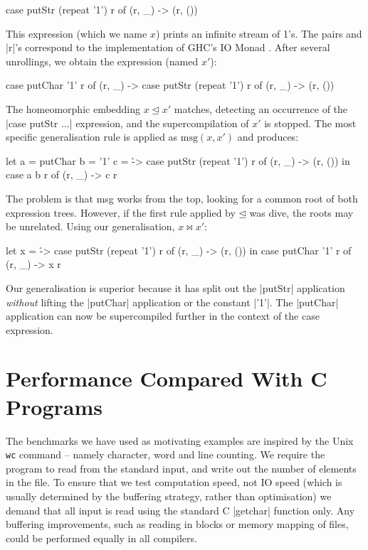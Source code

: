 \begin{example}

\begin{code}
case  putStr (repeat '1') r of
      (r, _) -> (r, ())
\end{code}

This expression (which we name $x$) prints an infinite stream of 1's. The pairs and |r|'s correspond to the implementation of GHC's IO Monad \cite{spj:awkward_squad}. After several unrollings, we obtain the expression (named $x'$):

\begin{code}
case  putChar '1' r of
      (r, _) -> case  putStr (repeat '1') r of
                      (r, _) -> (r, ())
\end{code}

The homeomorphic embedding $x \unlhd x'$ matches, detecting an occurrence of the |case putStr \? ...| expression, and the supercompilation of $x'$ is stopped. The most specific generalisation rule is applied as $\text{msg}(x,x')$ and produces:

\begin{code}
let  a = putChar
     b = '1'
     c = \r -> case  putStr (repeat '1') r of
                     (r, _) -> (r, ())
in case  a b r of
         (r, _) -> c r
\end{code}

The problem is that msg works from the top, looking for a common root of both expression trees. However, if the first rule applied by $\unlhd$ was dive, the roots may be unrelated. Using our generalisation, $x \bowtie x'$:

\begin{code}
let x = \r -> case  putStr (repeat '1') r of
                    (r, _) -> (r, ())
in case  putChar '1' r of
         (r, _) -> x r
\end{code}

Our generalisation is superior because it has split out the |putStr| application \textit{without} lifting the |putChar| application or the constant |'1'|. The |putChar| application can now be supercompiled further in the context of the case expression.
\end{example}


\section{Performance Compared With C Programs}
\label{sec:c_results}

The benchmarks we have used as motivating examples are inspired by the Unix \texttt{wc} command -- namely character, word and line counting. We require the program to read from the standard input, and write out the number of elements in the file. To ensure that we test computation speed, not IO speed (which is usually determined by the buffering strategy, rather than optimisation) we demand that all input is read using the standard C |getchar| function only. Any buffering improvements, such as reading in blocks or memory mapping of files, could be performed equally in all compilers.

